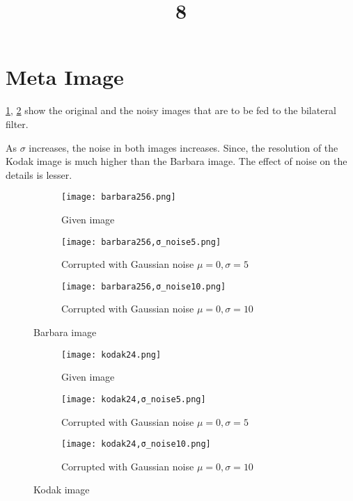 \documentclass[a4paper, landscape]{article}
\title{8}
\date{}
\begin{document}
\maketitle
\section{Meta Image}
\ref{fig:bo}, \ref{fig:ko} show the original and the noisy images that are to be fed to  the bilateral filter.

As $\sigma$ increases, the noise in both images increases. 
Since, the resolution of the Kodak image is much higher than the Barbara image. The effect of noise on the details is lesser.
\begin{figure}
    \centering
    \begin{subfigure}{0.33\linewidth}
        \centering
        \texttt{[image: barbara256.png]}
        \caption{Given image}
    \end{subfigure}
    \begin{subfigure}{0.33\linewidth}
        \centering
        \texttt{[image: barbara256,σ\_noise5.png]}
        \caption{Corrupted with Gaussian noise $\mu=0, \sigma=5$}
    \end{subfigure}
    \begin{subfigure}{0.33\linewidth}
        \centering
        \texttt{[image: barbara256,σ\_noise10.png]}
        \caption{Corrupted with Gaussian noise $\mu=0, \sigma=10$}
    \end{subfigure}
    \caption{Barbara image}
    \label{fig:bo}
\end{figure}
\begin{figure}
    \centering
    \begin{subfigure}{0.33\linewidth}
        \centering
        \texttt{[image: kodak24.png]}
        \caption{Given image}
    \end{subfigure}
    \begin{subfigure}{0.33\linewidth}
        \centering
        \texttt{[image: kodak24,σ\_noise5.png]}
        \caption{Corrupted with Gaussian noise $\mu=0, \sigma=5$}
    \end{subfigure}
    \begin{subfigure}{0.33\linewidth}
        \centering
        \texttt{[image: kodak24,σ\_noise10.png]}
        \caption{Corrupted with Gaussian noise $\mu=0, \sigma=10$}
    \end{subfigure}
    \caption{Kodak image}
    \label{fig:ko}
\end{figure}
\end{document}
